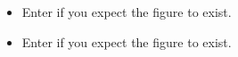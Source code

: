 
\begin{itemize}
\item Enter  if you expect the figure to exist. 
\item Enter  if you expect the figure  to exist. 
\end{itemize}


